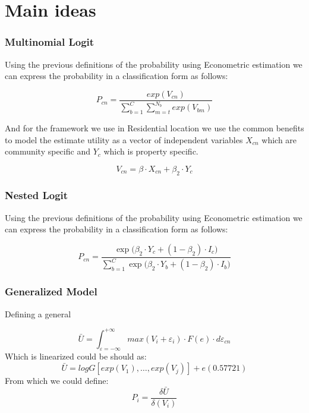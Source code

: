 \documentclass{beamer} %
\theoremstyle{definition}
\begin{document}
	\section{Main ideas}
	\begin{frame}
		\frametitle{Multinomial Logit}
		Using the previous definitions of the probability using Econometric estimation we can express the probability in a classification form as follows:
		
		$$ P_{cn} = \frac{exp(V_{cn})}{\sum_{b=1}^{C} \sum_{m=t}^{N_b} exp(V_{bm})} $$
		
		And for the framework we use in Residential location we use the common benefits to model the estimate utility as a vector of independent variables $X_{cn}$ which are community specific and $Y_c$ which is property specific.
		
		$$ V_{cn} = \beta \cdot X_{cn} + \beta_2 \cdot Y_c $$
		
	\end{frame}
	
	\begin{frame}
		\frametitle{Nested Logit}
		Using the previous definitions of the probability using Econometric estimation we can express the probability in a classification form as follows:
		
		$$ P_{c n} = \frac{\exp\big(\beta_2 \cdot Y_c + (1-\beta_2) \cdot I_c\big)}{\sum_{b=1}^{C} \exp\big(\beta_2 \cdot  Y_b + (1-\beta_2) \cdot I_b\big)} $$
		
	\end{frame}

	\begin{frame}
		\frametitle{Generalized Model}
		Defining a general 
		
		$$ \bar{U} = \int_{\varepsilon = - \infty}^{+\infty}  max (V_{i}+\varepsilon_i) \cdot F(e) \cdot d \varepsilon_{cn} $$
		Which is linearized could be should as:
		$$ \bar{U} = log G[exp(V_1),\hdots, exp(V_j)] + e (0.57721)$$
		From which we could define:
		$$ P_i = \frac{\delta \bar{U}}{\delta (V_i)}$$
		
	\end{frame}
\end{document}
